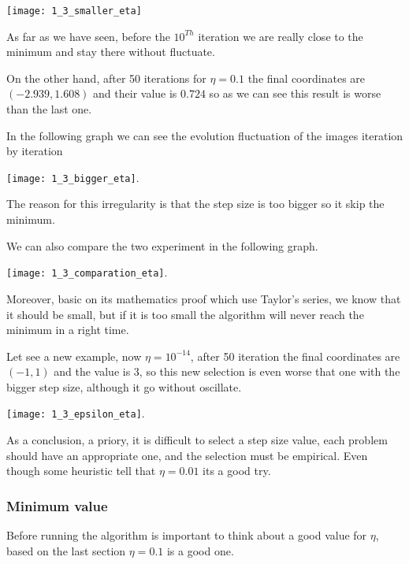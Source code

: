 \texttt{[image: 1\_3\_smaller\_eta]}

  As far as we have seen, before the $10^{Th}$ iteration we are really close to  the minimum and stay there without fluctuate.

  On the other hand, after 50 iterations for  $\eta = 0.1$ the final coordinates are $(-2.939, 1.608)$ and their value is $0.724$ so as we can see this result is worse than the last one.

  In the following graph we can see the evolution fluctuation of the images iteration by iteration 

  \texttt{[image: 1\_3\_bigger\_eta]}.

 The reason for this irregularity  is that the step size is too bigger so it skip the minimum.

 We can also  compare the two experiment in the following graph.
 
\texttt{[image: 1\_3\_comparation\_eta]}.


    Moreover, basic on its mathematics proof which use Taylor's series, we know that it should be small, but if it is too small the algorithm will never reach the minimum in a right time.

 Let see a new example, now $\eta = 10^{-14}$, after 50 iteration  the final coordinates are $(-1, 1)$  and the value is $3$, so this new selection is even worse that one with the bigger step size, although it go without oscillate.  

 \texttt{[image: 1\_3\_epsilon\_eta]}.
 
    
  As a conclusion, a priory, it is difficult to select a step size value, each problem should have an appropriate one, and the selection must be empirical. Even though some heuristic \cite{LFD} tell that $\eta = 0.01$ its a good try.  


  

\subsubsection{Minimum value }


Before running the algorithm is important to think about a good value for $\eta$, based on the last section $\eta = 0.1$ is a good one. 



